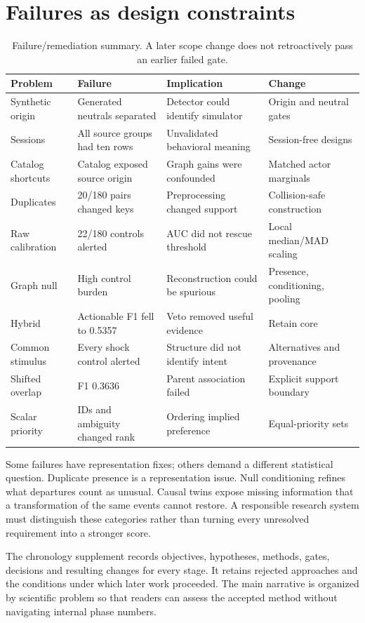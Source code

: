 \documentclass[11pt,letterpaper]{article}
\begin{document}
\section{Failures as design constraints}
\begin{table}[tbp]\centering\small
\caption{Failure/remediation summary. A later scope change does not retroactively pass an earlier failed gate.}
\begin{tabularx}{\linewidth}{@{}p{.17\linewidth}YYY@{}}\toprule
Problem & Failure & Implication & Change\\\midrule
Synthetic origin & Generated neutrals separated & Detector could identify simulator & Origin and neutral gates\\
Sessions & All source groups had ten rows & Unvalidated behavioral meaning & Session-free designs\\
Catalog shortcuts & Catalog exposed source origin & Graph gains were confounded & Matched actor marginals\\
Duplicates & 20/180 pairs changed keys & Preprocessing changed support & Collision-safe construction\\
Raw calibration & 22/180 controls alerted & AUC did not rescue threshold & Local median/MAD scaling\\
Graph null & High control burden & Reconstruction could be spurious & Presence, conditioning, pooling\\
Hybrid & Actionable F1 fell to 0.5357 & Veto removed useful evidence & Retain core\\
Common stimulus & Every shock control alerted & Structure did not identify intent & Alternatives and provenance\\
Shifted overlap & F1 0.3636 & Parent association failed & Explicit support boundary\\
Scalar priority & IDs and ambiguity changed rank & Ordering implied preference & Equal-priority sets\\\bottomrule
\end{tabularx}\end{table}
Some failures have representation fixes; others demand a different statistical question. Duplicate presence is a representation issue. Null conditioning refines what departures count as unusual. Causal twins expose missing information that a transformation of the same events cannot restore. A responsible research system must distinguish these categories rather than turning every unresolved requirement into a stronger score.

The chronology supplement records objectives, hypotheses, methods, gates, decisions and resulting changes for every stage. It retains rejected approaches and the conditions under which later work proceeded. The main narrative is organized by scientific problem so that readers can assess the accepted method without navigating internal phase numbers.
\end{document}
